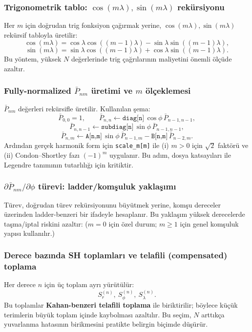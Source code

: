 \subsubsection{Trigonometrik tablo: $\cos(m\lambda),\sin(m\lambda)$ rekürsiyonu}

Her $m$ için doğrudan trig fonksiyon çağırmak yerine, $\cos(m\lambda),\sin(m\lambda)$
rekürsif tabloyla üretilir:
\[
\cos(m\lambda)=\cos\lambda\cos((m-1)\lambda)-\sin\lambda\sin((m-1)\lambda),
\]
\[
\sin(m\lambda)=\sin\lambda\cos((m-1)\lambda)+\cos\lambda\sin((m-1)\lambda).
\]
Bu yöntem, yüksek $N$ değerlerinde trig çağrılarının maliyetini önemli ölçüde azaltır.

\subsubsection{Fully-normalized $\bar P_{nm}$ üretimi ve $m$ ölçeklemesi}

$\bar P_{nm}$ değerleri rekürsifle üretilir. Kullanılan şema:
\[
\bar{P}_{0,0}=1,\qquad
\bar{P}_{n,n}\leftarrow \texttt{diag[n]}\,\cos\phi\,\bar{P}_{n-1,n-1},
\]
\[
\bar{P}_{n,n-1}\leftarrow \texttt{subdiag[n]}\,\sin\phi\,\bar{P}_{n-1,n-1},
\]
\[
\bar{P}_{n,m}\leftarrow \texttt{A[n,m]}\,\sin\phi\,\bar{P}_{n-1,m}-\texttt{B[n,m]}\,\bar{P}_{n-2,m}.
\]
Ardından gerçek harmonik form için
\texttt{scale\_m[m]} ile (i) $m>0$ için $\sqrt{2}$ faktörü ve (ii) Condon--Shortley fazı $(-1)^m$
uygulanır. Bu adım, dosya katsayıları ile Legendre tanımının tutarlılığı için kritiktir.

\subsubsection{$\partial \bar P_{nm}/\partial\phi$ türevi: ladder/komşuluk yaklaşımı}

Türev, doğrudan türev rekürsiyonunu büyütmek yerine,
komşu dereceler üzerinden ladder-benzeri bir ifadeyle hesaplanır.
Bu yaklaşım yüksek derecelerde taşma/iptal riskini azaltır:
($m=0$ için özel durum; $m\ge 1$ için genel komşuluk yapısı kullanılır.)

\subsubsection{Derece bazında SH toplamları ve telafili (compensated) toplama}

Her derece $n$ için üç toplam ayrı yürütülür:
\[
S_r^{(n)},\ S_\phi^{(n)},\ S_\lambda^{(n)}.
\]
Bu toplamlar \textbf{Kahan-benzeri telafili toplama} ile biriktirilir; böylece
küçük terimlerin büyük toplam içinde kaybolması azaltılır.
Bu seçim, $N$ arttıkça yuvarlanma hatasının birikmesini pratikte belirgin biçimde düşürür.


